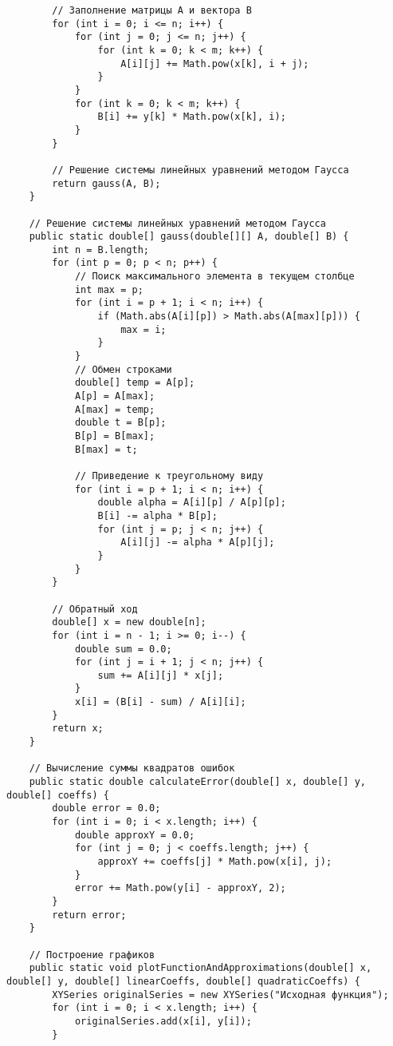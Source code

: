 \begin{verbatim}
        // Заполнение матрицы A и вектора B
        for (int i = 0; i <= n; i++) {
            for (int j = 0; j <= n; j++) {
                for (int k = 0; k < m; k++) {
                    A[i][j] += Math.pow(x[k], i + j);
                }
            }
            for (int k = 0; k < m; k++) {
                B[i] += y[k] * Math.pow(x[k], i);
            }
        }

        // Решение системы линейных уравнений методом Гаусса
        return gauss(A, B);
    }

    // Решение системы линейных уравнений методом Гаусса
    public static double[] gauss(double[][] A, double[] B) {
        int n = B.length;
        for (int p = 0; p < n; p++) {
            // Поиск максимального элемента в текущем столбце
            int max = p;
            for (int i = p + 1; i < n; i++) {
                if (Math.abs(A[i][p]) > Math.abs(A[max][p])) {
                    max = i;
                }
            }
            // Обмен строками
            double[] temp = A[p];
            A[p] = A[max];
            A[max] = temp;
            double t = B[p];
            B[p] = B[max];
            B[max] = t;

            // Приведение к треугольному виду
            for (int i = p + 1; i < n; i++) {
                double alpha = A[i][p] / A[p][p];
                B[i] -= alpha * B[p];
                for (int j = p; j < n; j++) {
                    A[i][j] -= alpha * A[p][j];
                }
            }
        }

        // Обратный ход
        double[] x = new double[n];
        for (int i = n - 1; i >= 0; i--) {
            double sum = 0.0;
            for (int j = i + 1; j < n; j++) {
                sum += A[i][j] * x[j];
            }
            x[i] = (B[i] - sum) / A[i][i];
        }
        return x;
    }

    // Вычисление суммы квадратов ошибок
    public static double calculateError(double[] x, double[] y, double[] coeffs) {
        double error = 0.0;
        for (int i = 0; i < x.length; i++) {
            double approxY = 0.0;
            for (int j = 0; j < coeffs.length; j++) {
                approxY += coeffs[j] * Math.pow(x[i], j);
            }
            error += Math.pow(y[i] - approxY, 2);
        }
        return error;
    }

    // Построение графиков
    public static void plotFunctionAndApproximations(double[] x, double[] y, double[] linearCoeffs, double[] quadraticCoeffs) {
        XYSeries originalSeries = new XYSeries("Исходная функция");
        for (int i = 0; i < x.length; i++) {
            originalSeries.add(x[i], y[i]);
        }


\end{verbatim}
